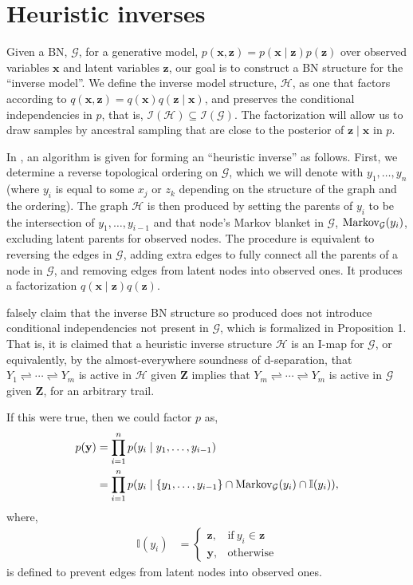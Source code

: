 \section{Heuristic inverses}

Given a BN, $\mathcal{G}$, for a generative model, $p(\mathbf{x}, \mathbf{z})=p(\mathbf{x}\mid\mathbf{z})p(\mathbf{z})$ over observed variables $\mathbf{x}$ and latent variables $\mathbf{z}$, our goal is to construct a BN structure for the ``inverse model''. 
We define the inverse model structure, $\mathcal{H}$, as one that factors according to $q(\mathbf{x}, \mathbf{z})=q(\mathbf{x})q(\mathbf{z}\mid\mathbf{x})$, and preserves the conditional independencies in $p$, that is, $\mathcal{I}(\mathcal{H})\subseteq\mathcal{I}(\mathcal{G})$. 
The factorization will allow us to draw samples by ancestral sampling that are close to the posterior of $\mathbf{z}\mid\mathbf{x}$ in $p$.

In \citep{StuhlmullerEtAl2013}, an algorithm is given for forming an ``heuristic inverse'' as follows. 
First, we determine a reverse topological ordering on $\mathcal{G}$, which we will denote with $y_1,\ldots,y_n$ (where $y_i$ is equal to some $x_j$ or $z_k$ depending on the structure of the graph and the ordering). 
The graph $\mathcal{H}$ is then produced by setting the parents of $y_i$ to be the intersection of $y_1,\ldots,y_{i-1}$ and that node's Markov blanket in $\mathcal{G}$, $\textnormal{Markov}_\mathcal{G}(y_i)$, excluding latent parents for observed nodes. 
The procedure is equivalent to reversing the edges in $\mathcal{G}$, adding extra edges to fully connect all the parents of a node in $\mathcal{G}$, and removing edges from latent nodes into observed ones. 
It produces a factorization $q(\mathbf{x}\mid\mathbf{z})q(\mathbf{z})$.

\citep{PaigeWood2016} falsely claim that the inverse BN structure so produced does not introduce conditional independencies not present in $\mathcal{G}$, which is formalized in Proposition 1. 
That is, it is claimed that a heuristic inverse structure $\mathcal{H}$ is an I-map for $\mathcal{G}$, or equivalently, by the almost-everywhere soundness of d-separation, that $Y_1\rightleftharpoons\cdots\rightleftharpoons Y_m$ is active in $\mathcal{H}$ given $\mathbf{Z}$ implies that $Y_m\rightleftharpoons\cdots\rightleftharpoons Y_m$ is active in $\mathcal{G}$ given $\mathbf{Z}$, for an arbitrary trail. 

If this were true, then we could factor $p$ as,
\begin{align*}
p(\mathbf{y}) &= \prod_{i=1}^np(y_i\mid y_1,\ldots,y_{i-1})\\
	&= \prod_{i=1}^np(y_i\mid \{y_1,\ldots,y_{i-1}\}\cap\textnormal{Markov}_\mathcal{G}(y_i)\cap\mathbb{I}(y_i)),
\end{align*}
where,
\begin{align*}
	\mathbb{I}(y_i) &=
	\begin{cases}
		\mathbf{z}, &\text{if}\ y_i\in\mathbf{z}\\
		\mathbf{y}, &\text{otherwise}
	\end{cases}
\end{align*}
is defined to prevent edges from latent nodes into observed ones.

